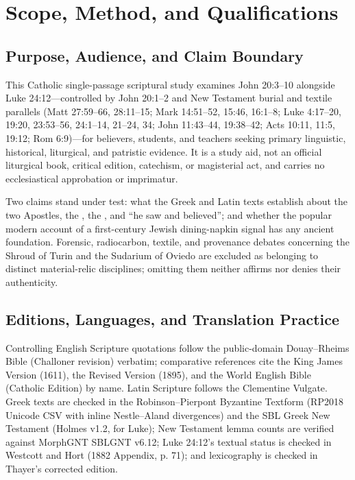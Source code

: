 \section{Scope, Method, and Qualifications}
\label{app:scope}

\subsection{Purpose, Audience, and Claim Boundary}

This Catholic single-passage scriptural study examines John 20:3--10 alongside Luke 24:12---controlled by John 20:1--2 and New Testament burial and textile parallels (Matt 27:59--66, 28:11--15; Mark 14:51--52, 15:46, 16:1--8; Luke 4:17--20, 19:20, 23:53--56, 24:1--14, 21--24, 34; John 11:43--44, 19:38--42; Acts 10:11, 11:5, 19:12; Rom 6:9)---for believers, students, and teachers seeking primary linguistic, historical, liturgical, and patristic evidence. It is a study aid, not an official liturgical book, critical edition, catechism, or magisterial act, and carries no ecclesiastical approbation or imprimatur.

Two claims stand under test: what the Greek and Latin texts establish about the two Apostles, the , the , and ``he saw and believed''; and whether the popular modern account of a first-century Jewish dining-napkin signal has any ancient foundation. Forensic, radiocarbon, textile, and provenance debates concerning the Shroud of Turin and the Sudarium of Oviedo are excluded as belonging to distinct material-relic disciplines; omitting them neither affirms nor denies their authenticity.

\subsection{Editions, Languages, and Translation Practice}

Controlling English Scripture quotations follow the public-domain Douay--Rheims Bible (Challoner revision) verbatim; comparative references cite the King James Version (1611), the Revised Version (1895), and the World English Bible (Catholic Edition) by name. Latin Scripture follows the Clementine Vulgate. Greek texts are checked in the Robinson--Pierpont Byzantine Textform (RP2018 Unicode CSV with inline Nestle--Aland divergences) and the SBL Greek New Testament (Holmes v1.2, for Luke); New Testament lemma counts are verified against MorphGNT SBLGNT v6.12; Luke 24:12's textual status is checked in Westcott and Hort (1882 Appendix, p. 71); and lexicography is checked in Thayer's corrected edition.

